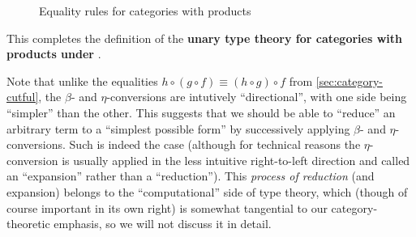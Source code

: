 \begin{figure}
  \centering
  \caption{Equality rules for categories with products}
  \label{fig:catprod-equality}
\end{figure}

This completes the definition of the \textbf{unary type theory for categories with products under \cG}.

\begin{rmk}\label{rmk:beta-reduction}
  Note that unlike the equalities $h\circ (g\circ f) \equiv (h\circ g)\circ f$ from \cref{sec:category-cutful}, the $\beta$- and $\eta$-conversions are intutively ``directional'', with one side being ``simpler'' than the other.
  This suggests that we should be able to ``reduce'' an arbitrary term to a ``simplest possible form'' by successively applying $\beta$- and $\eta$-conversions.
  Such is indeed the case (although for technical reasons the $\eta$-conversion is usually applied in the less intuitive right-to-left direction and called an ``expansion'' rather than a ``reduction'').
  This \emph{process of reduction} (and expansion) belongs to the ``computational'' side of type theory, which (though of course important in its own right) is somewhat tangential to our category-theoretic emphasis, so we will not discuss it in detail.
\end{rmk}

